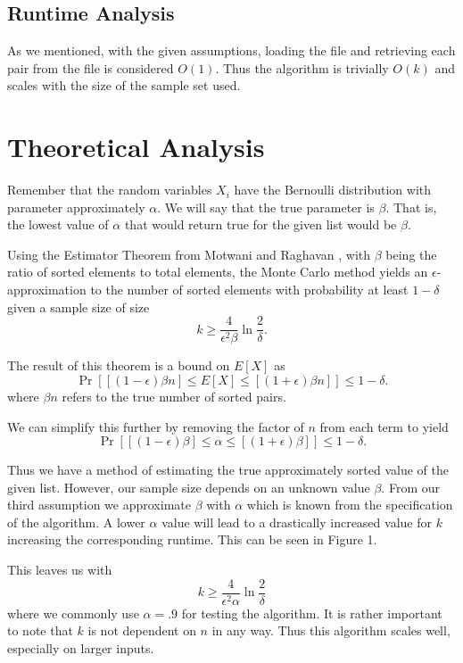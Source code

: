 \documentclass[11pt]{article}
\begin{document}
\subsection{Runtime Analysis}

As we mentioned, with the given assumptions, loading the file and retrieving each pair from the file is considered $O(1)$. Thus the algorithm is trivially $O(k)$ and scales with the size of the sample set used. 

\section{Theoretical Analysis}

Remember that the random variables $X_i$ have the Bernoulli distribution with parameter approximately $\alpha$. We will say that the true parameter is $\beta$. That is, the lowest value of $\alpha$ that would return true for the given list would be $\beta$. 

Using the Estimator Theorem from Motwani and Raghavan \cite{textbook}, with $\beta$ being the ratio of sorted elements to total elements, the Monte Carlo method yields an $\epsilon$-approximation to the number of sorted elements with probability at least $1-\delta$ given a sample size of size $$k \geq \frac{4}{\epsilon^2 \beta} \ln \frac{2}{\delta}.$$ 

The result of this theorem is a bound on $E[X]$ as $$\Pr\left[ [(1-\epsilon)\beta n] \leq E[X] \leq [(1+\epsilon)\beta n] \right] \leq 1 - \delta.$$ where $\beta n$ refers to the true number of sorted pairs. 

We can simplify this further by removing the factor of $n$ from each term to yield $$\Pr\left[ [(1-\epsilon)\beta] \leq \alpha \leq [(1+\epsilon)\beta] \right] \leq 1 - \delta.$$

Thus we have a method of estimating the true approximately sorted value of the given list. However, our sample size depends on an unknown value $\beta$. From our third assumption we approximate $\beta$ with $\alpha$ which is known from the specification of the algorithm. A lower $\alpha$ value will lead to a drastically increased value for $k$ increasing the corresponding runtime. This can be seen in Figure 1.

This leaves us with $$k \geq \frac{4}{\epsilon^2 \alpha} \ln \frac{2}{\delta}$$ where we commonly use $\alpha = .9$ for testing the algorithm. It is rather important to note that $k$ is not dependent on $n$ in any way. Thus this algorithm scales well, especially on larger inputs.
\end{document}
